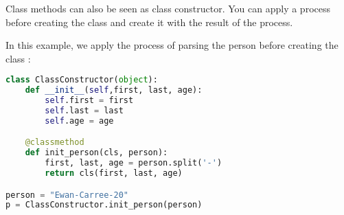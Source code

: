 \documentclass[a4paper, 12pt, titlepage]{scrartcl} %
\begin{document}
Class methods can also be seen as class constructor. You can apply a process before creating the class and create it with the result of the process.

\vspace{5mm}

In this example, we apply the process of parsing the person before creating the class :

\begin{lstlisting}[language=Python]
class ClassConstructor(object):
	def __init__(self,first, last, age):
		self.first = first
		self.last = last
		self.age = age

	@classmethod
	def init_person(cls, person):
		first, last, age = person.split('-')
		return cls(first, last, age)

person = "Ewan-Carree-20"
p = ClassConstructor.init_person(person)
\end{lstlisting} \vspace{5mm}
\end{document}

